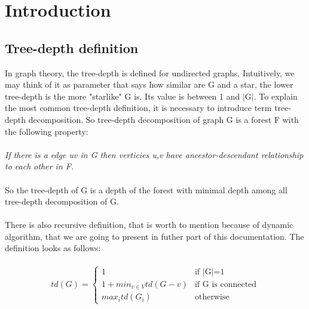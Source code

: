 \section{Introduction}
\subsection{Tree-depth definition}
In graph theory, the tree-depth is defined for undirected graphs. Intuitively, we may think of it as parameter that says how similar are G and a star, the lower tree-depth is the more "starlike" G is. Its value is between 1 and $|$G$|$. To explain the most common tree-depth definition, it is necessary to introduce term tree-depth decomposition. So tree-depth decomposition of graph G is a forest F with the following property:\\\\
\emph{If there is a edge uv in G then verticies u,v have ancestor-descendant relationship to each other in F.}\\\\
So the tree-depth of G is a depth of the forest with minimal depth among all tree-depth decomposition of G.\\\\
There is also recursive definition, that is worth to mention because of dynamic algorithm, that we are going to present in futher part of this documentation. The definition looks as follows:\\\\
\begin{equation}
td(G) =
\begin{cases}
1 & \text{if $|$G$|$=1}\\
1+min_{v \in V} td(G-v) & \text{if G is connected}\\
max_{i} td(G_{i})  & \text{otherwise}
\end{cases}\label{td_def}
\end{equation}
\\\\
